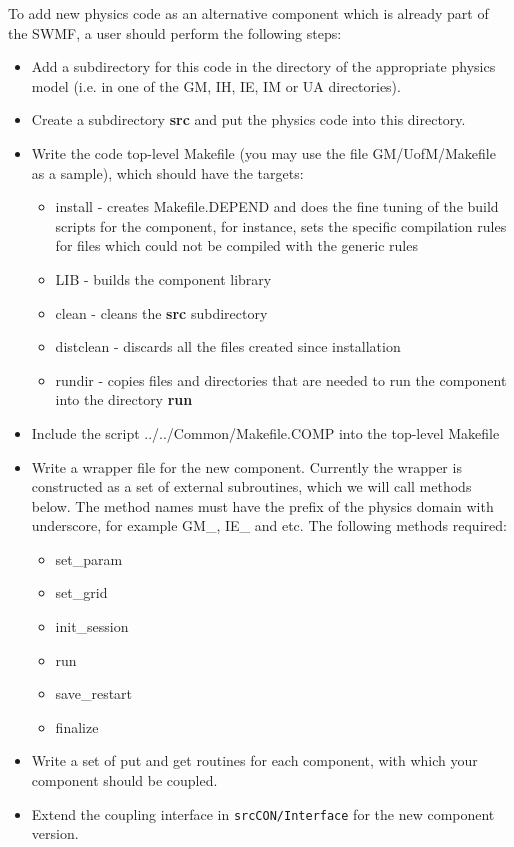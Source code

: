 To add new physics code as an alternative component which is already part of 
the SWMF, a user should perform the following steps:

\begin{itemize}
\item Add a subdirectory for this code in the directory of the 
appropriate physics model (i.e. in one of the GM, IH, IE, IM or UA
directories).

\item Create a subdirectory \textbf{src} and put the physics code into this directory.
 
\item Write the code top-level Makefile (you may use the file GM/UofM/Makefile 
 as a sample), which should have the targets:

\begin{itemize}
\item install - creates Makefile.DEPEND and does the fine 
                tuning of the build scripts 
                for the component, for instance, sets the specific 
                compilation rules for files which 
                could not be compiled with the generic rules 
\item LIB - builds the component library
\item clean - cleans the \textbf{src} subdirectory
\item distclean - discards all the files created since installation
\item rundir - copies files and directories that are needed to run the 
               component into the directory \textbf{run}
\end{itemize}

\item Include the script ../../Common/Makefile.COMP into the top-level Makefile

\item Write a wrapper file for the new component. Currently the wrapper is constructed as 
a set of external subroutines, which we will call methods below. 
The method names must have the prefix 
of the physics domain with underscore, for example GM\_, IE\_ and etc. 
The following methods required:

\begin{itemize}
\item set\_param
\item set\_grid
\item init\_session
\item run
\item save\_restart
\item finalize

\end{itemize}
\item Write a set of put and get routines for each component, with which your component 
should be coupled.

\item Extend the coupling interface in {\tt srcCON/Interface} for the
      new component version.

\end{itemize}


